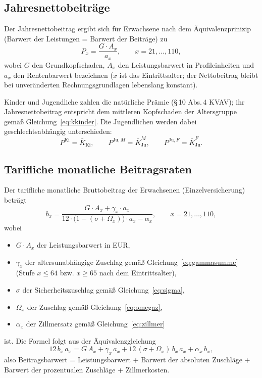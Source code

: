 \subsection{Jahresnettobeiträge}\label{sec:nettobeitraege}

Der Jahresnettobeitrag ergibt sich für Erwachsene nach dem
Äquivalenzprinizip (Barwert der Leistungen = Barwert der Beiträge) zu
\begin{equation}
P_x = \frac{G\cdot A_x}{a_x},
\qquad x = 21,\dots,110,
\label{eq:netto}
\end{equation}
wobei $G$ den Grundkopfschaden, $A_x$ den Leistungsbarwert in
Profileinheiten und $a_x$ den Rentenbarwert bezeichnen ($x$ ist das
Eintrittsalter; der Nettobeitrag bleibt bei unveränderten
Rechnungsgrundlagen lebenslang konstant).

Kinder und Jugendliche zahlen die natürliche Prämie (\S\,10 Abs.\,4
KVAV); ihr Jahresnettobeitrag entspricht dem mittleren Kopfschaden der
Altersgruppe gemäß Gleichung~\eqref{eq:kkinder}. Die Jugendlichen werden
dabei geschlechtsabhängig unterschieden:
\begin{equation}
P^{\mathrm{Ki}} = \bar{K}_{\mathrm{Ki}},
\qquad
P^{\mathrm{Ju},M} = \bar{K}^{M}_{\mathrm{Ju}},
\qquad
P^{\mathrm{Ju},F} = \bar{K}^{F}_{\mathrm{Ju}}.
\label{eq:pkinder}
\end{equation}

\subsection{Tarifliche monatliche Beitragsraten}\label{sec:beitragsraten}

Der tarifliche monatliche Bruttobeitrag der Erwachsenen
(Einzelversicherung) beträgt
\begin{equation}
b_x = \frac{G\cdot A_x + \gamma_x\cdot a_x}
           {12\cdot\bigl(1-(\sigma+\Omega_x)\bigr)\cdot a_x - \alpha_x},
\qquad x = 21,\dots,110,
\label{eq:brutto}
\end{equation}
wobei
\begin{itemize}\itemsep1pt
  \item $G\cdot A_x$ der Leistungsbarwert in EUR,
  \item $\gamma_x$ der altersunabhängige Zuschlag gemäß
        Gleichung~\eqref{eq:gammasumme} (Stufe $x \le 64$ bzw.
        $x \ge 65$ nach dem Eintrittsalter),
  \item $\sigma$ der Sicherheitszuschlag gemäß
        Gleichung~\eqref{eq:sigma},
  \item $\Omega_x$ der Zuschlag gemäß Gleichung~\eqref{eq:omegaz},
  \item $\alpha_x$ der Zillmersatz gemäß Gleichung~\eqref{eq:zillmer}
\end{itemize}
ist. Die Formel folgt aus der Äquivalenzgleichung
\begin{equation}
12\,b_x\,a_x = G\,A_x + \gamma_x\,a_x
+ 12\,(\sigma+\Omega_x)\,b_x\,a_x + \alpha_x\,b_x,
\label{eq:aequivalenz}
\end{equation}
also Beitragsbarwert = Leistungsbarwert + Barwert der absoluten Zuschläge
+ Barwert der prozentualen Zuschläge + Zillmerkosten.

